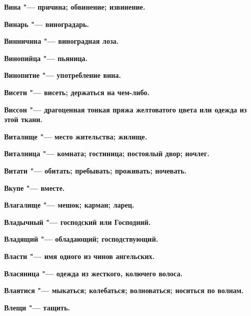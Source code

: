 \begin{mymulticols}{2}
\bfseries Вина\normalfont{} "--- причина; обвинение; извинение. 




\bfseries Винарь\normalfont{} "--- виноградарь. 




\bfseries Винничина\normalfont{} "--- виноградная лоза. 




\bfseries Винопийца\normalfont{} "--- пьяница. 




\bfseries Винопитие\normalfont{} "--- употребление вина. 




\bfseries Висети\normalfont{} "--- висеть; держаться на чем-либо. 




\bfseries Виссон\normalfont{} "--- драгоценная тонкая пряжа желтоватого цвета или одежда из этой ткани. 




\bfseries Виталище\normalfont{} "--- место жительства; жилище. 




\bfseries Виталница\normalfont{} "--- комната; гостиница; постоялый двор; ночлег. 




\bfseries Витати\normalfont{} "--- обитать; пребывать; проживать; ночевать. 




\bfseries Вкупе\normalfont{} "--- вместе. 




\bfseries Влагалище\normalfont{} "--- мешок; карман; ларец. 




\bfseries Владычный\normalfont{} "--- господский или Господний. 




\bfseries Владящий\normalfont{} "--- обладающий; господствующий. 




\bfseries Власти\normalfont{} "--- имя одного из чинов ангельских. 




\bfseries Власяница\normalfont{} "--- одежда из жесткого, колючего волоса. 




\bfseries Влаятися\normalfont{} "--- мыкаться; колебаться; волноваться; носиться по волнам. 




\bfseries Влещи\normalfont{} "--- тащить. 





\end{mymulticols}
